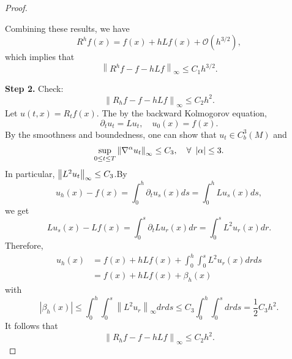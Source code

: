 \begin{proof}
\begin{enumerate}[label=\Roman{*}.]
        Combining these results, we have
        \begin{equation*}
            R^hf(x) = f(x) + hLf(x) + \mathcal{O}(h^{3/2}),
        \end{equation*}
        which implies that
        \begin{equation*}
            \left\|R^h f-f-h L f\right\|_{\infty} \leq C_1 h^{3/2}.
        \end{equation*}
    \end{enumerate}

    \vspace{0.5em}
    \textbf{Step 2.} Check:
    \begin{equation*}
        \left\|R_h f-f-h L f\right\|_{\infty} \leq C_2 h^2.
    \end{equation*}
    Let $u(t,x) = R_tf(x)$. The by the backward Kolmogorov equation,
    \begin{equation*}
        \partial_t u_t = Lu_t,\quad u_0(x) = f(x).
    \end{equation*}
    By the smoothness and boundedness, one can show that $u_t \in C^3_b(M)$ and 
    \begin{equation}\label{eq:bound_parabolic}
        \sup _{0 \leq t \leq T}\left\|\nabla^\alpha u_t\right\|_{\infty} \leq C_3,\quad \forall~\left\lvert\alpha\right\lvert \leq 3.
    \end{equation}
    In particular, $\left\lVert L^2 u_t\right\lVert_\infty \leq C_3$.By
    \begin{equation*}
        u_h(x)-f(x)=\int_0^h \partial_t u_s(x) d s=\int_0^h L u_s(x) d s,
    \end{equation*}
    we get
    \begin{equation*}
        Lu_s(x)-Lf(x)=\int_0^s \partial_t Lu_r(x) d r=\int_0^s L^2 u_r(x) d r.
    \end{equation*}
    Therefore,
    \begin{align*}
        u_h(x) & =f(x)+h L f(x)+\int_0^h \int_0^s L^2 u_r(x) d r d s \\
        & =f(x)+h L f(x)+\beta_h(x)
    \end{align*}
    with
    \begin{equation*}
        \left|\beta_h(x)\right| \leq \int_0^h \int_0^s\left\|L^2 u_r\right\|_{\infty} d r d s \leq C_3 \int_0^h \int_0^s d r d s=\frac{1}{2} C_3 h^2.
    \end{equation*}
    It follows that
    \begin{equation*}
        \left\|R_h f-f-h L f\right\|_{\infty} \leq C_2 h^2.
    \end{equation*}


\end{proof}
